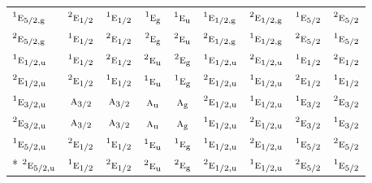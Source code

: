 \documentclass[10pt,a4paper]{article}
\numberwithin{equation}{section}
\newcommand{\irr}[1]{\text{\normalfont\scshape #1}}
\newcommand{\conjpair}[1]{{}^{#1}}
\newcommand{\ptag}[1]{\mathrm{#1}}
\begin{document}
{\begin{longtable}{@{}lcccccccc@{}}
$\conjpair{1}\irr{e}_{5/2,\ptag{g}}$ & $\conjpair{2}\irr{e}_{1/2}$ & $\conjpair{1}\irr{e}_{1/2}$ & $\conjpair{1}\irr{e}_{\ptag{g}}$ & $\conjpair{1}\irr{e}_{\ptag{u}}$ & $\conjpair{1}\irr{e}_{1/2,\ptag{g}}$ & $\conjpair{2}\irr{e}_{1/2,\ptag{g}}$ & $\conjpair{1}\irr{e}_{5/2}$ & $\conjpair{2}\irr{e}_{5/2}$\\
$\conjpair{2}\irr{e}_{5/2,\ptag{g}}$ & $\conjpair{1}\irr{e}_{1/2}$ & $\conjpair{2}\irr{e}_{1/2}$ & $\conjpair{2}\irr{e}_{\ptag{g}}$ & $\conjpair{2}\irr{e}_{\ptag{u}}$ & $\conjpair{2}\irr{e}_{1/2,\ptag{g}}$ & $\conjpair{1}\irr{e}_{1/2,\ptag{g}}$ & $\conjpair{2}\irr{e}_{5/2}$ & $\conjpair{1}\irr{e}_{5/2}$\\
$\conjpair{1}\irr{e}_{1/2,\ptag{u}}$ & $\conjpair{1}\irr{e}_{1/2}$ & $\conjpair{2}\irr{e}_{1/2}$ & $\conjpair{2}\irr{e}_{\ptag{u}}$ & $\conjpair{2}\irr{e}_{\ptag{g}}$ & $\conjpair{1}\irr{e}_{1/2,\ptag{u}}$ & $\conjpair{2}\irr{e}_{1/2,\ptag{u}}$ & $\conjpair{1}\irr{e}_{1/2}$ & $\conjpair{2}\irr{e}_{1/2}$\\
$\conjpair{2}\irr{e}_{1/2,\ptag{u}}$ & $\conjpair{2}\irr{e}_{1/2}$ & $\conjpair{1}\irr{e}_{1/2}$ & $\conjpair{1}\irr{e}_{\ptag{u}}$ & $\conjpair{1}\irr{e}_{\ptag{g}}$ & $\conjpair{2}\irr{e}_{1/2,\ptag{u}}$ & $\conjpair{1}\irr{e}_{1/2,\ptag{u}}$ & $\conjpair{2}\irr{e}_{1/2}$ & $\conjpair{1}\irr{e}_{1/2}$\\
$\conjpair{1}\irr{e}_{3/2,\ptag{u}}$ & $\irr{a}_{3/2}$ & $\irr{a}_{3/2}$ & $\irr{a}_{\ptag{u}}$ & $\irr{a}_{\ptag{g}}$ & $\conjpair{2}\irr{e}_{1/2,\ptag{u}}$ & $\conjpair{1}\irr{e}_{1/2,\ptag{u}}$ & $\conjpair{1}\irr{e}_{3/2}$ & $\conjpair{2}\irr{e}_{3/2}$\\
$\conjpair{2}\irr{e}_{3/2,\ptag{u}}$ & $\irr{a}_{3/2}$ & $\irr{a}_{3/2}$ & $\irr{a}_{\ptag{u}}$ & $\irr{a}_{\ptag{g}}$ & $\conjpair{1}\irr{e}_{1/2,\ptag{u}}$ & $\conjpair{2}\irr{e}_{1/2,\ptag{u}}$ & $\conjpair{2}\irr{e}_{3/2}$ & $\conjpair{1}\irr{e}_{3/2}$\\
$\conjpair{1}\irr{e}_{5/2,\ptag{u}}$ & $\conjpair{2}\irr{e}_{1/2}$ & $\conjpair{1}\irr{e}_{1/2}$ & $\conjpair{1}\irr{e}_{\ptag{u}}$ & $\conjpair{1}\irr{e}_{\ptag{g}}$ & $\conjpair{1}\irr{e}_{1/2,\ptag{u}}$ & $\conjpair{2}\irr{e}_{1/2,\ptag{u}}$ & $\conjpair{1}\irr{e}_{5/2}$ & $\conjpair{2}\irr{e}_{5/2}$\\*
$\conjpair{2}\irr{e}_{5/2,\ptag{u}}$ & $\conjpair{1}\irr{e}_{1/2}$ & $\conjpair{2}\irr{e}_{1/2}$ & $\conjpair{2}\irr{e}_{\ptag{u}}$ & $\conjpair{2}\irr{e}_{\ptag{g}}$ & $\conjpair{2}\irr{e}_{1/2,\ptag{u}}$ & $\conjpair{1}\irr{e}_{1/2,\ptag{u}}$ & $\conjpair{2}\irr{e}_{5/2}$ & $\conjpair{1}\irr{e}_{5/2}$\\
\bottomrule\end{longtable}}
\end{document}
